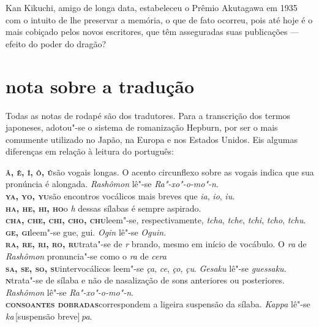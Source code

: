 Kan Kikuchi, amigo de longa data, estabeleceu o Prêmio Akutagawa em
1935 com o intuito de lhe preservar a memória, o que de fato ocorreu,
pois até hoje é o mais cobiçado pelos novos escritores, que têm
asseguradas suas publicações --- efeito do poder do dragão?

\section*{nota sobre a tradução}

Todas as notas de rodapé são dos tradutores.		
Para a transcrição dos termos japoneses, adotou"-se o sistema de
romanização Hepburn, por ser o mais comumente utilizado no Japão, na
Europa e nos Estados Unidos. Eis algumas diferenças em relação à
leitura do português:

\medskip

\noindent\textbf{\textsc{â, ê, î, ô, û}}\quad são vogais longas. O acento circunflexo sobre as vogais indica que sua pronúncia é alongada. \textit{Rashômon} lê"-se \textit{Ra"-xo"-o-mo"-n}.\\
\smallskip
\noindent\textbf{\textsc{ya, yo, yu}}\quad são encontros vocálicos mais breves que \textit{ia}, \textit{io}, \textit{iu}.\\
\smallskip
\noindent\textbf{\textsc{ha, he, hi, ho}}\quad o \textit{h} dessas sílabas é sempre aspirado.\\
\smallskip
\noindent\textbf{\textsc{cha, che, chi, cho, chu}}\quad leem"-se, respectivamente, \textit{tcha}, \textit{tche}, \textit{tchi}, \textit{tcho}, \textit{tchu}.\\
\smallskip
\noindent\textbf{\textsc{ge, gi}}\quad leem"-se gue, gui. \textit{Ogin} lê"-se \textit{Oguin}.\\
\smallskip
\noindent\textbf{\textsc{ra, re, ri, ro, ru}}\quad trata"-se de \textit{r} brando, mesmo em início de vocábulo. O \textit{ra} de \textit{Rashômon} pronuncia"-se como o \textit{ra} de \textit{cera}\\
\smallskip
\noindent\textbf{\textsc{sa, se, so, su}}\quad intervocálicos leem"-se \textit{ça}, \textit{ce}, \textit{ço}, \textit{çu}. \textit{Gesaku} lê"-se \textit{guessaku}.\\
\smallskip
\noindent\textbf{\textsc{n}}\quad trata"-se de sílaba e não de nasalização de sons anteriores ou posteriores. \textit{Rashômon} lê"-se \textit{Ra"-xo"-o-mo"-n}.\\
\smallskip
\noindent\textbf{\textsc{consoantes dobradas}}\quad correspondem a ligeira suspensão da sílaba. \textit{Kappa} lê"-se \textit{ka}\,{[}suspensão breve{]}\,\textit{pa}.
